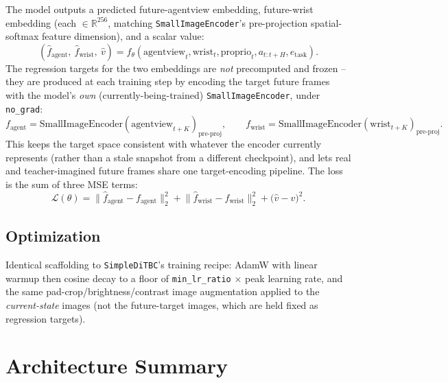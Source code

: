 \documentclass[11pt]{article}
\begin{document}
The model outputs a predicted future-agentview embedding, future-wrist embedding (each
$\in \mathbb{R}^{256}$, matching \texttt{SmallImageEncoder}'s pre-projection spatial-softmax
feature dimension), and a scalar value:
\begin{equation}
    (\hat{f}_{\text{agent}},\ \hat{f}_{\text{wrist}},\ \hat{v}) =
    f_\theta(\text{agentview}_t, \text{wrist}_t, \text{proprio}_t, a_{t:t+H}, e_{\text{task}}).
\end{equation}
The regression targets for the two embeddings are \emph{not} precomputed and frozen -- they are
produced at each training step by encoding the target future frames with the model's \emph{own}
(currently-being-trained) \texttt{SmallImageEncoder}, under \texttt{no\_grad}:
\begin{equation}
    f_{\text{agent}} = \text{SmallImageEncoder}(\text{agentview}_{t+K})_{\text{pre-proj}}, \qquad
    f_{\text{wrist}} = \text{SmallImageEncoder}(\text{wrist}_{t+K})_{\text{pre-proj}}.
\end{equation}
This keeps the target space consistent with whatever the encoder currently represents (rather than
a stale snapshot from a different checkpoint), and lets real and teacher-imagined future frames
share one target-encoding pipeline. The loss is the sum of three MSE terms:
\begin{equation}
    \mathcal{L}(\theta) = \big\| \hat{f}_{\text{agent}} - f_{\text{agent}} \big\|_2^2
        + \big\| \hat{f}_{\text{wrist}} - f_{\text{wrist}} \big\|_2^2
        + \big( \hat{v} - v \big)^2.
\end{equation}

\subsection{Optimization}

Identical scaffolding to \texttt{SimpleDiTBC}'s training recipe: AdamW with linear warmup then
cosine decay to a floor of \texttt{min\_lr\_ratio} $\times$ peak learning rate, and the same
pad-crop/brightness/contrast image augmentation applied to the \emph{current-state} images (not
the future-target images, which are held fixed as regression targets).

\section{Architecture Summary}
\end{document}
